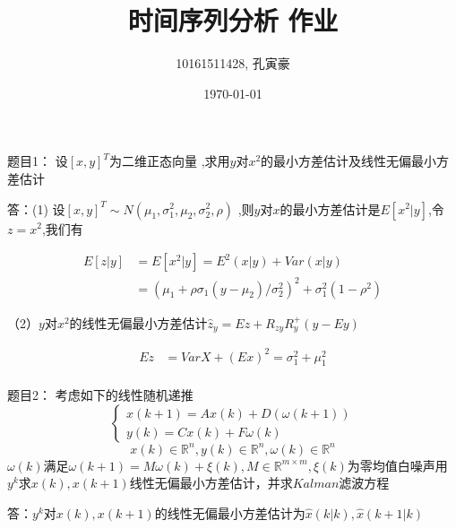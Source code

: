 \documentclass[12pt, a4paper]{ctexart}
\title{时间序列分析 作业}
\author{10161511428, 孔寅豪}
\date{\today}
\begin{document}
\maketitle{}

\begin{flushleft}
    \qquad 题目1：
    设$[x, y]^T$为二维正态向量
    ,求用$y$对$x^2$的最小方差估计及线性无偏最小方差估计


    \qquad 答：(1) 设$[x, y]^T \sim  N(\mu_1,\sigma_1 ^2, \mu_2, \sigma_2 ^2, \rho)$ ,则$y$对$x$的最小方差估计是$E[x^2|y]$,令$z = x ^ 2$,我们有

    \[
    \begin{aligned}
    E[z|y] &= E[x^2|y] = E^2(x|y) + Var(x|y) \\ 
    &=(\mu_1 + \rho \sigma_1(y - \mu_2) / \sigma_2 ^ 2 )^2 + \sigma_1 ^2(1 - \rho^2)
    \end{aligned}
    \]
    
   （2）$y$对$x^2$的线性无偏最小方差估计$\hat{z}_{y} = Ez + R_{zy}R_{y}^{+}(y-Ey)$


    \[
    \begin{aligned}
     Ez &= VarX + (Ex)^2 = \sigma_1 ^2 + \mu_1 ^2 \\    
    \end{aligned}
    \]


    \qquad 题目2：
    考虑如下的线性随机递推
    \[
    \left\{\begin{array}{ll}
    { x(k+1) = Ax(k) + D(\omega(k+1)) }  \\  %
    { y(k) = Cx(k)+F\omega(k) }
    \end{array}\right.
    \]
    \[
    x(k) \in \mathbb{R}^n, y(k) \in \mathbb{R}^n,\omega(k) \in \mathbb{R}^n 
    \]
    $\omega(k)$满足$\omega(k + 1) = M\omega(k) + \xi(k), M \in \mathbb{R}^{m \times m},\xi(k)$为零均值白噪声用$y^k$求$x(k),x(k + 1)$线性无偏最小方差估计，并求$Kalman$滤波方程

    \qquad 答：$y^k$对$x(k),x(k + 1)$的线性无偏最小方差估计为$\hat{x}(k | k), \hat{x} (k + 1 | k)$
    


\end{flushleft}
\end{document}
